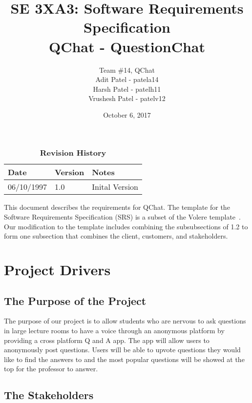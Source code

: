 \documentclass[12pt, titlepage]{article}
\title{SE 3XA3: Software Requirements Specification\\QChat - QuestionChat}
\author{Team \#14, QChat
		\\ Adit Patel - patela14
		\\ Harsh Patel - patelh11
		\\ Vrushesh Patel - patelv12
}
\date{October 6, 2017}
\begin{document}
\maketitle

\tableofcontents
\listoftables

\begin{table}[bp]
\caption{\bf Revision History}
\begin{tabularx}{\textwidth}{p{3cm}p{2cm}X}
\toprule {\bf Date} & {\bf Version} & {\bf Notes}\\
\midrule
06/10/1997 & 1.0 & Inital Version\\
\bottomrule
\end{tabularx}
\end{table}

\newpage


This document describes the requirements for QChat.  The template for the Software
Requirements Specification (SRS) is a subset of the Volere
template~\citep{RobertsonAndRobertson2012}. Our modification to the template includes combining the subsubsections of 1.2 to form one subsection that combines the client, customers, and stakeholders.

\section{Project Drivers}

\subsection{The Purpose of the Project}
The purpose of our project is to allow students who are nervous to ask questions in large lecture rooms to have a voice through an anonymous platform by providing a cross platform Q and A app. The app will allow users to anonymously post questions. Users will be able to upvote questions they would like to find the answers to and the most popular questions will be showed at the top for the professor to answer.

\subsection{The Stakeholders}
\end{document}
